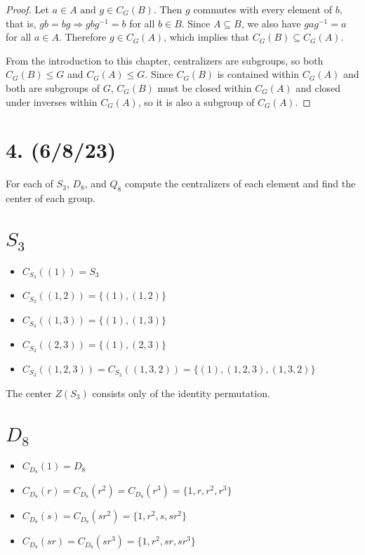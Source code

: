 \documentclass{article}
\begin{document}
\begin{proof}
    Let $a \in A \text{ and } g \in C_G(B)$. Then $g$ commutes with every element of $b$, that is, $gb = bg \Rightarrow gbg^{-1} = b$ for all $b \in B$. Since $A \subseteq B$, we also have $gag^{-1} = a$ for all $a \in A$. Therefore $g \in C_G(A)$, which implies that $C_G(B) \subseteq C_G(A)$.

    From the introduction to this chapter, centralizers are subgroups, so both $C_G(B) \leq G$ and $C_G(A) \leq G$. Since $C_G(B)$ is contained within $C_G(A)$ and both are subgroups of $G$, $C_G(B)$ must be closed within $C_G(A)$ and closed under inverses within $C_G(A)$, so it is also a subgroup of $C_G(A)$.
\end{proof}

\section*{4. (6/8/23)}

For each of $S_3$, $D_8$, and $Q_8$ compute the centralizers of each element and find the center of each group.

\section*{$S_3$}

\begin{itemize}
    \item $C_{S_3}((1)) = S_3$
    \item $C_{S_3}((1, 2)) = \{ (1), (1, 2) \}$
    \item $C_{S_3}((1, 3)) = \{ (1), (1, 3) \}$
    \item $C_{S_3}((2, 3)) = \{ (1), (2, 3) \}$
    \item $C_{S_3}((1, 2, 3)) = C_{S_3}((1, 3, 2)) = \{ (1), (1, 2, 3), (1, 3, 2) \}$
\end{itemize}

The center $Z(S_3)$ consists only of the identity permutation.

\section*{$D_8$}

\begin{itemize}
    \item $C_{D_8}(1) = D_8$
    \item $C_{D_8}(r) = C_{D_8}(r^2) = C_{D_8}(r^3) = \{ 1, r, r^2, r^3 \}$
    \item $C_{D_8}(s) = C_{D_8}(sr^2) = \{ 1, r^2, s, sr^2 \}$
    \item $C_{D_8}(sr) = C_{D_8}(sr^3) = \{ 1, r^2, sr, sr^3 \}$
\end{itemize}
\end{document}
